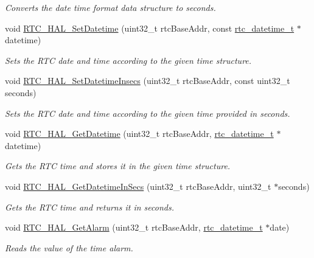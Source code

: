 \begin{DoxyCompactItemize}
\begin{DoxyCompactList}\small\item\em Converts the date time format data structure to seconds. \end{DoxyCompactList}\item 
void \hyperlink{group__rtc__hal_ga3f0ab61d920d9cc23ad96af735d14601}{R\+T\+C\+\_\+\+H\+A\+L\+\_\+\+Set\+Datetime} (uint32\+\_\+t rtc\+Base\+Addr, const \hyperlink{group__rtc__hal_ga079a66794dec7b821f9f5fdb6c7c8642}{rtc\+\_\+datetime\+\_\+t} $\ast$datetime)
\begin{DoxyCompactList}\small\item\em Sets the R\+TC date and time according to the given time structure. \end{DoxyCompactList}\item 
void \hyperlink{group__rtc__hal_ga60ab24af85534b8b0095bd005cf740de}{R\+T\+C\+\_\+\+H\+A\+L\+\_\+\+Set\+Datetime\+Insecs} (uint32\+\_\+t rtc\+Base\+Addr, const uint32\+\_\+t seconds)
\begin{DoxyCompactList}\small\item\em Sets the R\+TC date and time according to the given time provided in seconds. \end{DoxyCompactList}\item 
void \hyperlink{group__rtc__hal_ga2c76abb37aa936b669963028418d81b3}{R\+T\+C\+\_\+\+H\+A\+L\+\_\+\+Get\+Datetime} (uint32\+\_\+t rtc\+Base\+Addr, \hyperlink{group__rtc__hal_ga079a66794dec7b821f9f5fdb6c7c8642}{rtc\+\_\+datetime\+\_\+t} $\ast$datetime)
\begin{DoxyCompactList}\small\item\em Gets the R\+TC time and stores it in the given time structure. \end{DoxyCompactList}\item 
void \hyperlink{group__rtc__hal_ga78137db04d8f8a5e376bfa554f01db5b}{R\+T\+C\+\_\+\+H\+A\+L\+\_\+\+Get\+Datetime\+In\+Secs} (uint32\+\_\+t rtc\+Base\+Addr, uint32\+\_\+t $\ast$seconds)
\begin{DoxyCompactList}\small\item\em Gets the R\+TC time and returns it in seconds. \end{DoxyCompactList}\item 
void \hyperlink{group__rtc__hal_ga4f2b669596fe55e0f68f0b48402b8507}{R\+T\+C\+\_\+\+H\+A\+L\+\_\+\+Get\+Alarm} (uint32\+\_\+t rtc\+Base\+Addr, \hyperlink{group__rtc__hal_ga079a66794dec7b821f9f5fdb6c7c8642}{rtc\+\_\+datetime\+\_\+t} $\ast$date)
\begin{DoxyCompactList}\small\item\em Reads the value of the time alarm. \end{DoxyCompactList}\item 

\end{DoxyCompactItemize}
